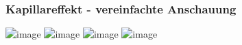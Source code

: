 \documentclass{beamer}
\begin{document}
\begin{frame}
\end{frame}



\begin{frame}
\frametitle{Kapillareffekt - vereinfachte Anschauung}

\begin{center}
\includegraphics<1>[width=\textwidth]{kapillare_1.png}
\includegraphics<2>[width=\textwidth]{kapillare_2.png}
\includegraphics<3>[width=\textwidth]{kapillare_3.png}
\includegraphics<4>[width=\textwidth]{kapillare_4.png}
\end{center}

\end{frame}

\begin{frame}
\end{frame}
\end{document}
